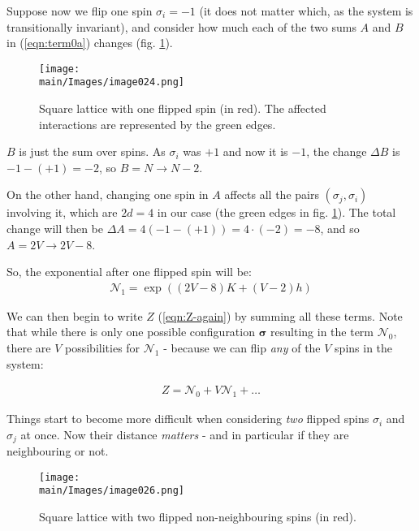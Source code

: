 \documentclass[../../main.tex]{subfiles}
\begin{document}
\medskip

Suppose now we flip one spin $\sigma_i = -1$ (it does not matter which, as the system is transitionally invariant), and consider how much each of the two sums $A$ and $B$ in (\ref{eqn:term0a}) changes (fig. \ref{fig:one-flip}).

\begin{figure}[H]
    \centering
    \texttt{[image: \\main/Images/image024.png]}
    \caption{Square lattice with one flipped spin (in red). The affected interactions are represented by the green edges.\label{fig:one-flip}}
\end{figure}

$B$ is just the sum over spins. As $\sigma_i$ was $+1$ and now it is $-1$, the change $\Delta B$ is $-1 - (+1) = -2$, so $B = N \to N-2$.

On the other hand, changing one spin in $A$ affects all the pairs $(\sigma_j, \sigma_i)$ involving it, which are $2d=4$ in our case (the green edges in fig. \ref{fig:one-flip}). The total change will then be $\Delta A = 4 (-1 - (+1)) = 4 \cdot (-2) = -8$, and so $A = 2V \to 2V-8$.

So, the exponential after one flipped spin will be:
\begin{align}\label{eqn:term1}
    \mathcal{N}_1 = \exp\left((2V - 8)K + (V-2)h\right)
\end{align}

We can then begin to write $Z$ (\ref{eqn:Z-again}) by summing all these terms. Note that while there is only one possible configuration $\bm{\sigma}$ resulting in the term $\mathcal{N}_0$, there are $V$ possibilities for $\mathcal{N}_1$ - because we can flip \textit{any} of the $V$ spins in the system:

\begin{align*}
    Z = \mathcal{N}_0 + V \mathcal{N}_1 + \dots
\end{align*}

Things start to become more difficult when considering \textit{two} flipped spins $\sigma_i$ and $\sigma_j$ at once. Now their distance \textit{matters} - and in particular if they are neighbouring or not.

\begin{figure}[H]
    \centering
    \texttt{[image: \\main/Images/image026.png]}
    \caption{Square lattice with two flipped non-neighbouring spins (in red).\label{fig:two-flip-far}}
\end{figure}
\end{document}
